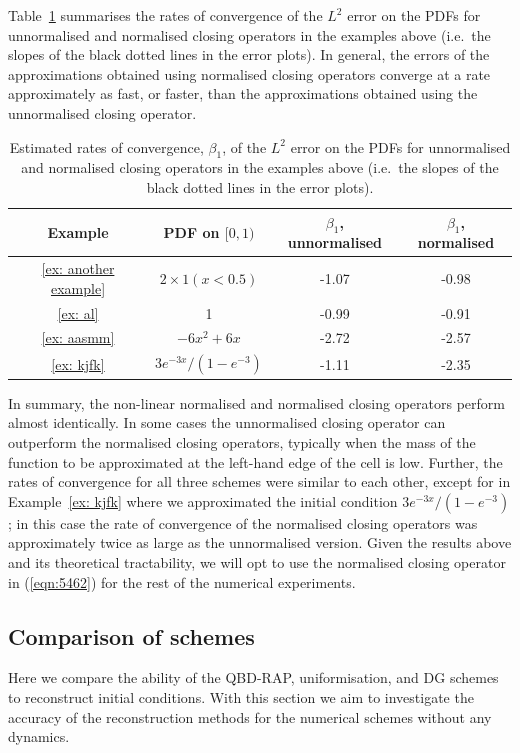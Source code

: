 Table~\ref{table: error rates for QBD-RAP closing} summarises the rates of convergence of the \(L^2\) error on the PDFs for unnormalised and normalised closing operators in the examples above (i.e.~the slopes of the black dotted lines in the error plots). In general, the errors of the approximations obtained using normalised closing operators converge at a rate approximately as fast, or faster, than the approximations obtained using the unnormalised closing operator.
\begin{table}
	\centering
	\begin{tabular}{c|c|c|c}
			Example & PDF on \([0,1)\) & \(\beta_1\), unnormalised & \(\beta_1\), normalised \\\hline
			\ref{ex: another example} & \(2\times 1(x<0.5)\) & -1.07 & -0.98 \\
			\ref{ex: al} & 1 & -0.99 & -0.91 \\
			\ref{ex: aasmm} & \(-6x^2+6x\) & -2.72 & -2.57 \\ 
			\ref{ex: kjfk} & \(3e^{-3x}/(1-e^{-3})\) & -1.11 & -2.35 
	\end{tabular}
	\caption{\label{table: error rates for QBD-RAP closing} Estimated rates of convergence, \(\beta_1\), of the \(L^2\) error on the PDFs for unnormalised and normalised closing operators in the examples above (i.e.~the slopes of the black dotted lines in the error plots).}
\end{table} 

In summary, the non-linear normalised and normalised closing operators perform almost identically. In some cases the unnormalised closing operator can outperform the normalised closing operators, typically when the mass of the function to be approximated at the left-hand edge of the cell is low. Further, the rates of convergence for all three schemes were similar to each other, except for in Example~\ref{ex: kjfk} where we approximated the initial condition \(3e^{-3x}/(1-e^{-3})\); in this case the rate of convergence of the normalised closing operators was approximately twice as large as the unnormalised version. Given the results above and its theoretical tractability, we will opt to use the normalised closing operator in (\ref{eqn:5462}) for the rest of the numerical experiments.

\FloatBarrier
\subsection{Comparison of schemes}\label{sec: comp}
Here we compare the ability of the QBD-RAP, uniformisation, and DG schemes to reconstruct initial conditions. With this section we aim to investigate the accuracy of the reconstruction methods for the numerical schemes without any dynamics. 

